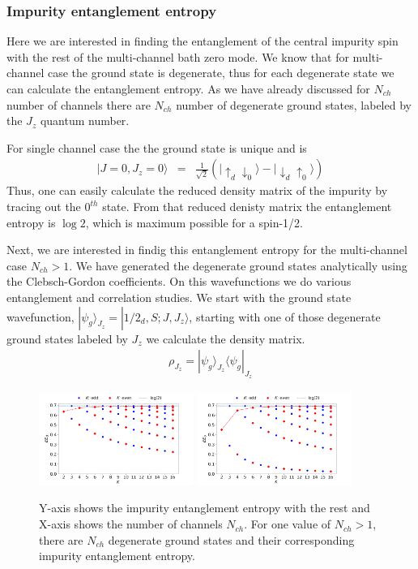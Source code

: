 \documentclass[reprint,prb,superscriptaddress]{revtex4-2}
\begin{document}
\subsubsection{Impurity entanglement entropy}
\noindent Here we are interested in finding the entanglement of the central impurity spin with the rest of the multi-channel bath zero mode. We know that for multi-channel case the ground state is degenerate, thus for each degenerate state we can calculate the entanglement entropy. As we have already discussed for $N_{ch}$ number of channels there are $N_{ch}$ number of degenerate ground states, labeled by the $J_z$ quantum number.\\
\par For single channel case the the ground state is unique and is 
\begin{eqnarray}
|J=0,J_z=0 \rangle &=& \frac{1}{\sqrt{2}} (|\uparrow_{d}\downarrow_0\rangle -|\downarrow_d \uparrow_0\rangle)
\end{eqnarray}
Thus, one can easily calculate the reduced density matrix of the impurity by tracing out the $0^{th}$ state. From that reduced denisty matrix the entanglement entropy is $\log 2$, which is maximum possible for a spin-1/2.
\par Next, we are interested in findig this entanglement entropy for the multi-channel case $N_{ch}>1$. We have generated the degenerate ground states analytically using the Clebsch-Gordon coefficients. On this wavefunctions we do various entanglement and correlation studies. We start with the ground state wavefunction, $|\psi_g\rangle_{J_z}=|1/2_{d},S;J,J_z\rangle$, starting with one of those degenerate ground states labeled by $J_z$ we calculate the density matrix.
\begin{eqnarray}
\rho_{J_z}=|\psi_g\rangle_{J_z} \langle\psi_g|_{J_z}
\end{eqnarray}

\begin{figure}[!ht]
\centering
\includegraphics[width=0.45\textwidth]{plt/EE_multi_channel_ANN.png}
\includegraphics[width=0.45\textwidth]{plt/outer_EE_multi_channel_ANN.png}
\caption{Y-axis shows the impurity entanglement entropy with the rest and X-axis shows the number of channels $N_{ch}$. For one value of $N_{ch}>1$, there are $N_{ch}$ degenerate ground states and their corresponding impurity entanglement entropy. }
\end{figure}
\end{document}
